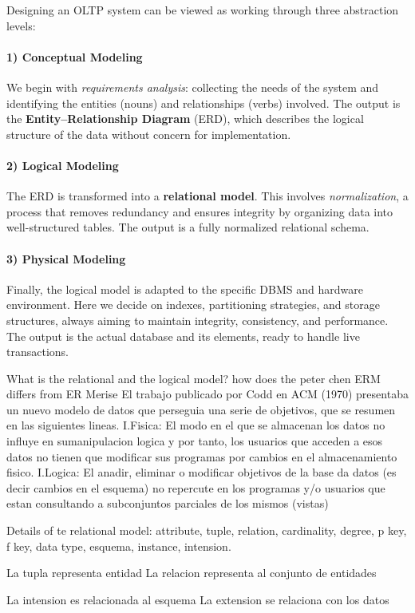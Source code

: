 \documentclass[12pt,a4paper]{article}
\begin{document}
Designing an OLTP system can be viewed as working through three abstraction levels:

\paragraph{1) Conceptual Modeling}  
We begin with \emph{requirements analysis}:  
collecting the needs of the system and identifying the entities (nouns) and relationships (verbs) involved.  
The output is the \textbf{Entity–Relationship Diagram} (ERD), which describes the logical structure of the data without concern for implementation.

\paragraph{2) Logical Modeling}  
The ERD is transformed into a \textbf{relational model}.  
This involves \emph{normalization}, a process that removes redundancy and ensures integrity by organizing data into well-structured tables.  
The output is a fully normalized relational schema.

\paragraph{3) Physical Modeling}  
Finally, the logical model is adapted to the specific DBMS and hardware environment.  
Here we decide on indexes, partitioning strategies, and storage structures,  
always aiming to maintain integrity, consistency, and performance.  
The output is the actual database and its elements, ready to handle live transactions.


What is the relational and the logical model? how does the peter chen ERM differs from ER Merise
El trabajo publicado por Codd en ACM (1970) presentaba un nuevo modelo de datos que perseguia una serie de objetivos, que se resumen en las siguientes lineas.
I.Fisica: El modo en el que se almacenan los datos no influye en sumanipulacion logica y por tanto, los usuarios que acceden a esos datos no tienen que modificar sus programas por cambios en el almacenamiento fisico.
I.Logica: El anadir, eliminar o modificar objetivos de la base da datos (es decir cambios en el esquema) no repercute en los programas y/o usuarios que estan consultando a subconjuntos parciales de los mismos (vistas)

Details of te relational model: attribute, tuple, relation, cardinality, degree, p key, f key, data type, esquema, instance, intension.

La tupla representa entidad
La relacion representa al conjunto de entidades

La intension es relacionada al esquema
La extension se relaciona con los datos
\end{document}
